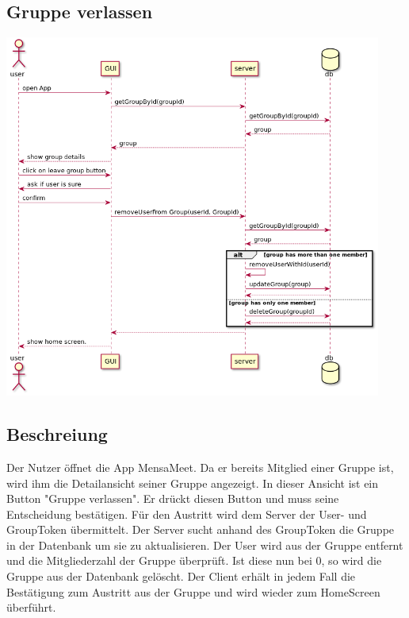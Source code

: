 \documentclass[a4paper]{scrreprt}
\begin{document}
\newpage
\subsection{Gruppe verlassen}
\begin{center}
	\includegraphics[width=0.93\textwidth]{Sequenzdiagramme/leaveGroupSD.png}
\end{center}

\subsection*{Beschreiung}
Der Nutzer öffnet die App MensaMeet. Da er bereits Mitglied einer Gruppe ist, wird ihm die Detailansicht seiner Gruppe angezeigt.
In dieser Ansicht ist ein Button "Gruppe verlassen". Er drückt diesen Button und muss seine Entscheidung bestätigen. Für den Austritt wird dem Server der User- und GroupToken übermittelt. Der Server sucht anhand des GroupToken die Gruppe in der Datenbank um sie zu aktualisieren. Der User wird aus der Gruppe entfernt und die Mitgliederzahl der Gruppe überprüft. Ist diese nun bei 0, so wird die Gruppe aus der Datenbank gelöscht.
Der Client erhält in jedem Fall die Bestätigung zum Austritt aus der Gruppe und wird wieder zum HomeScreen überführt.
\end{document}
